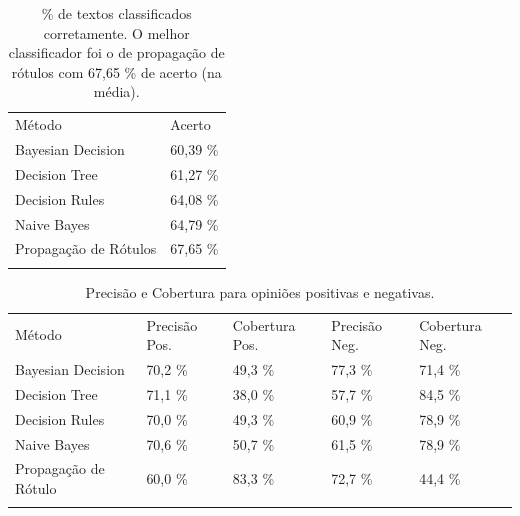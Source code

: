 \documentclass[12pt]{article}
\begin{document}
\begin{table}
\centering
\caption{\% de textos classificados corretamente. O melhor classificador foi o de propagação de rótulos com 67,65 \% de acerto (na média).} 
\label{tab:4rec}       %
\begin{tabular}{p{4.5cm}p{2cm}}
\hline\noalign{\smallskip}
Método & Acerto    \\
\noalign{\smallskip}\svhline\noalign{\smallskip}
Bayesian Decision & 60,39 \%\\
Decision Tree & 61,27 \%\\
Decision Rules & 64,08 \%\\
Naive Bayes & 64,79 \%\\
Propagação de Rótulos & 67,65 \%\\
\noalign{\smallskip}\hline\noalign{\smallskip}
\end{tabular}
\end{table}

\begin{table}
\centering
\caption{Precisão e Cobertura para opiniões positivas e negativas.}
\label{tab:prerec}       %
\begin{tabular}{p{1.5cm}p{1cm}p{1cm}p{1cm}p{1cm}}
\hline\noalign{\smallskip}
{\footnotesize Método} & {\footnotesize Precisão Pos.} & {\footnotesize Cobertura Pos.} & {\footnotesize Precisão Neg.} & {\footnotesize Cobertura Neg.} \\
\noalign{\smallskip}\svhline\noalign{\smallskip}
{\footnotesize Bayesian Decision} & {\footnotesize 70,2} \%  & {\footnotesize 49,3} \% & {\footnotesize 77,3} \% & {\footnotesize 71,4 \%} \\
{\footnotesize Decision Tree} &  {\footnotesize 71,1} \% & {\footnotesize 38,0} \% & {\footnotesize 57,7} \% & {\footnotesize 84,5} \% \\
{\footnotesize Decision Rules} & {\footnotesize 70,0} \% & {\footnotesize 49,3} \% & {\footnotesize 60,9} \% & {\footnotesize 78,9} \% \\
{\footnotesize Naive Bayes} & {\footnotesize 70,6} \% & {\footnotesize 50,7} \% & {\footnotesize 61,5} \% & {\footnotesize 78,9} \% \\
{\footnotesize Propagação de Rótulo} & {\footnotesize 60,0} \% & {\footnotesize 83,3} \% & {\footnotesize 72,7} \% & {\footnotesize 44,4} \% \\
\noalign{\smallskip}\hline\noalign{\smallskip}
\end{tabular}
\end{table}
\end{document}
